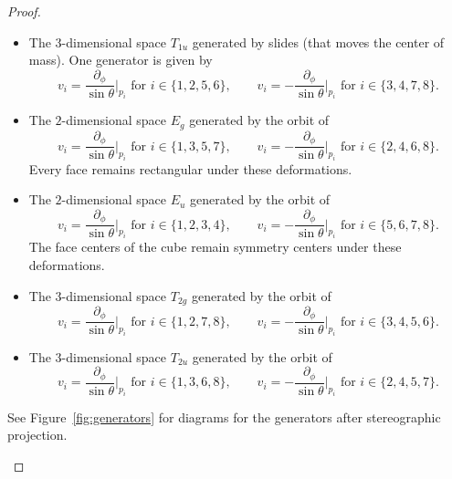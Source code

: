 \documentclass[a4paper]{amsart}
\theoremstyle{plain} %
\theoremstyle{definition} %
\theoremstyle{remark}
\begin{document}
\begin{proof}
	\begin{itemize}
		\item The $3$-dimensional space $T_{1u}$ generated by slides (that moves the
			center of mass).  One generator is given by
			\[
				v_i = \frac{\partial_\phi}{\sin\theta}\Big|_{p_i} \text{ for } i \in \{1, 2, 5, 6\},\qquad
				v_i =-\frac{\partial_\phi}{\sin\theta}\Big|_{p_i} \text{ for } i \in \{3, 4, 7, 8\}.
			\]
		\item The $2$-dimensional space $E_g$ generated by the orbit of
			\[
				v_i = \frac{\partial_\phi}{\sin\theta}\Big|_{p_i} \text{ for } i \in \{1, 3, 5, 7\},\qquad
				v_i =-\frac{\partial_\phi}{\sin\theta}\Big|_{p_i} \text{ for } i \in \{2, 4, 6, 8\}.
			\]
			Every face remains rectangular under these deformations.
		\item The $2$-dimensional space $E_u$ generated by the orbit of
			\[
				v_i = \frac{\partial_\phi}{\sin\theta}\Big|_{p_i} \text{ for } i \in \{1, 2, 3, 4\},\qquad
				v_i =-\frac{\partial_\phi}{\sin\theta}\Big|_{p_i} \text{ for } i \in \{5, 6, 7, 8\}.
			\]
			The face centers of the cube remain symmetry centers under these deformations.
		\item The $3$-dimensional space $T_{2g}$ generated by the orbit of
			\[
				v_i = \frac{\partial_\phi}{\sin\theta}\Big|_{p_i} \text{ for } i \in \{1, 2, 7, 8\},\qquad
				v_i =-\frac{\partial_\phi}{\sin\theta}\Big|_{p_i} \text{ for } i \in \{3, 4, 5, 6\}.
			\]
		\item The $3$-dimensional space $T_{2u}$ generated by the orbit of
			\[
				v_i = \frac{\partial_\phi}{\sin\theta}\Big|_{p_i} \text{ for } i \in \{1, 3, 6, 8\},\qquad
				v_i =-\frac{\partial_\phi}{\sin\theta}\Big|_{p_i} \text{ for } i \in \{2, 4, 5, 7\}.
			\]
	\end{itemize}

	See Figure~\ref{fig:generators} for diagrams for the generators after
	stereographic projection.

	\begin{figure}[ht]
  	\centering


\end{figure}
\end{proof}
\end{document}
